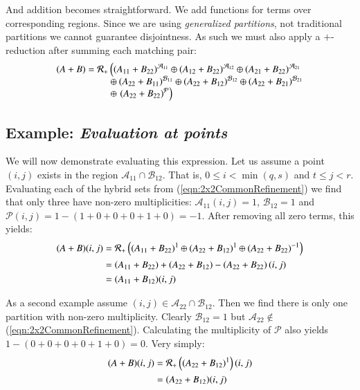 And addition becomes straightforward. 
We add functions for terms over corresponding regions.
Since we are using \emph{generalized partitions}, not traditional partitions we cannot guarantee disjointness.
As such we must also apply a $+$-reduction after summing each matching pair:
\begin{align*}
	(A+B) = \R[+] & \left(  (A_{11}+B_{22})^{\mathcal{A}_{11}} \oplus 
		(A_{12} + B_{22})^{\mathcal{A}_{12}} \oplus 
		(A_{21} + B_{22})^{\mathcal{A}_{21}} \right. \\[-0.5em] &\oplus 
		(A_{22} + B_{11})^{\mathcal{B}_{11}} \oplus 
		(A_{22} + B_{12})^{\mathcal{B}_{12}} \oplus 
		(A_{22} + B_{21})^{\mathcal{B}_{21}} \\[-0.5em] &\oplus
		\left.(A_{22} + B_{22})^{\mathcal{P}} \right)
\end{align*}


\subsection{Example: \emph{Evaluation at points}} 
We will now demonstrate evaluating this expression.
Let us assume a point $(i,j)$ exists in the region $\mathcal{A}_{11} \cap \mathcal{B}_{12}$.
That is, $0 \leq i < \min(q,s)$ and $t \leq j < r$. 
Evaluating each of the hybrid sets from (\ref{eqn:2x2CommonRefinement}) we find that only three have 
non-zero multiplicities: $\mathcal{A}_{11}(i,j)=1$, $\mathcal{B}_{12}=1$ and 
$\mathcal{P}(i,j)=1-(1+0+0+0+1+0)=-1$.
After removing all zero terms, this yields:
\begin{align*}
	(A+B)(i,j) &= \R[+]  \left(  (A_{11}+B_{22})^{1} \oplus 
		(A_{22} + B_{12})^{1} \oplus 
		(A_{22} + B_{22})^{-1} \right)\\
		&= \left(A_{11}+B_{22}) + (A_{22} + B_{12}) - (A_{22} + B_{22}\right)(i,j)\\
		&= (A_{11}+B_{12})(i,j)
\end{align*}

As a second example assume $(i,j) \in \mathcal{A}_{22} \cap \mathcal{B}_{12}$.
Then we find there is only one partition with non-zero multiplicity.
Clearly $\mathcal{B}_{12} = 1$ but $\mathcal{A}_{22} \notin$(\ref{eqn:2x2CommonRefinement}).
Calculating the multiplicity of $\mathcal{P}$ also yields $1-(0+0+0+0+1+0) = 0$.
Very simply:
\begin{align*}
	(A+B)(i,j) &= \R[+]  \left(  (A_{22}+B_{12})^{1} \right)(i,j)\\
		&=(A_{22}+B_{12})(i,j)
\end{align*}


